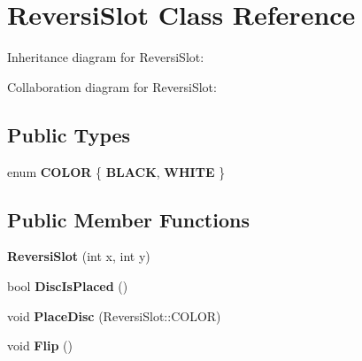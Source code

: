 \hypertarget{classReversiSlot}{}\section{Reversi\+Slot Class Reference}
\label{classReversiSlot}


Inheritance diagram for Reversi\+Slot\+:


Collaboration diagram for Reversi\+Slot\+:
\subsection*{Public Types}
\begin{DoxyCompactItemize}
\item 
\mbox{\label{classReversiSlot_a44e0d424583c24d6c929d717efe532c7}} 
enum {\bfseries C\+O\+L\+OR} \{ {\bfseries B\+L\+A\+CK}, 
{\bfseries W\+H\+I\+TE}
 \}
\end{DoxyCompactItemize}
\subsection*{Public Member Functions}
\begin{DoxyCompactItemize}
\item 
\mbox{\label{classReversiSlot_a68d3c8efd58f9754fd7338287a391550}} 
{\bfseries Reversi\+Slot} (int x, int y)
\item 
\mbox{\label{classReversiSlot_a7816512c180521bc7d9f91bb4d87e7e1}} 
bool {\bfseries Disc\+Is\+Placed} ()
\item 
\mbox{\label{classReversiSlot_abe87bcc006fcd895d9149aee9fed0bb9}} 
void {\bfseries Place\+Disc} (Reversi\+Slot\+::\+C\+O\+L\+OR)
\item 
\mbox{\label{classReversiSlot_ac6cc6ebc87a5042b2725207727992d4e}} 
void {\bfseries Flip} ()
\end{DoxyCompactItemize}
